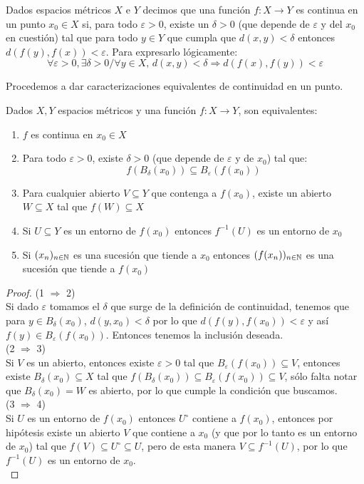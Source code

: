 \documentclass[12pt,a4paper]{book}
\begin{document}
\begin{defi}
Dados espacios métricos $X$ e $Y$ decimos que una función $f:X \rightarrow Y$ es continua en un punto $x_0 \in X$ si, para todo $\varepsilon > 0$, existe un $\delta > 0$ (que depende de $\varepsilon$ y del $x_0$ en cuestión) tal que para todo $y \in Y$ que cumpla que $d(x,y)<\delta$ entonces $d(f(y),f(x))<\varepsilon$. Para expresarlo lógicamente:
$$ \forall \varepsilon>0, \exists \delta>0 \slash \forall y \in X,\, d(x,y)<\delta \Rightarrow d(f(x),f(y))<\varepsilon$$
\end{defi}
Procedemos a dar caracterizaciones equivalentes de continuidad en un punto.
\begin{teo}
Dados $X,Y$ espacios métricos y una función $f:X \rightarrow Y$, son equivalentes:
\begin{enumerate}
\item $f$ es continua en $x_0 \in X$
\item Para todo $\varepsilon > 0$, existe $\delta>0$ (que depende de $\varepsilon$ y de $x_0$) tal que:
$$ f\left( B_\delta(x_0) \right) \subseteq B_\varepsilon(f(x_0))$$
\item Para cualquier abierto $V \subseteq Y$ que contenga a $f(x_0)$, existe un abierto $W \subseteq X$ tal que $f(W)\subseteq X$
\item Si $U \subseteq Y$ es un entorno de $f(x_0)$ entonces $f^{-1}(U)$ es un entorno de $x_0$
\item Si $(x_n)_{{n} \in \mathbb{N}}$ es una sucesión que tiende a $x_0$ entonces $(f(x_n))_{{n} \in \mathbb{N}}$ es una sucesión que tiende a $f(x_0)$
\end{enumerate}
\begin{proof}
(1 $\Rightarrow$ 2)\\
Si dado $\varepsilon$ tomamos el $\delta$ que surge de la definición de continuidad, tenemos que para $y \in B_\delta(x_0)$, $d(y,x_0)<\delta$ por lo que $d(f(y),f(x_0))<\varepsilon$ y así $f(y) \in B_\varepsilon(f(x_0))$. Entonces tenemos la inclusión deseada.\\
(2 $\Rightarrow$ 3)\\
Si $V$ es un abierto, entonces existe $\varepsilon >0$ tal que $B_\varepsilon(f(x_0)) \subseteq V$, entonces existe $B_\delta(x_0)\subseteq X$ tal que $f\left( B_\delta(x_0) \right) \subseteq B_\varepsilon(f(x_0)) \subseteq V$, sólo falta notar que $B_\delta(x_0)  = W$ es abierto, por lo que cumple la condición que buscamos.\\
(3 $\Rightarrow$ 4)\\
Si $U$ es un entorno de $f(x_0)$ entonces $U^\circ$ contiene a $f(x_0)$, entonces por hipótesis existe un abierto $V$ que contiene a $x_0$ (y que por lo tanto es un entorno de $x_0$) tal que $f(V)\subseteq U^\circ \subseteq U$, pero de esta manera $V \subseteq f^{-1}(U)$, por lo que $f^{-1}(U)$ es un entorno de $x_0$.\\

\end{proof}
\end{teo}
\end{document}
